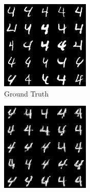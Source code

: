 \begin{figure}[H]
    \centering
    \begin{subfigure}[b]{0.24\textwidth}
        \centering
        \includegraphics[width=\textwidth]{figures/einsum/4mnist_ground_truth.png}
        \caption{Ground Truth}
    \end{subfigure}
    \begin{subfigure}[b]{0.24\textwidth}
        \centering
        \includegraphics[width=\textwidth]{figures/einsum/4mnist_EM.png}

\end{subfigure}
\end{figure}
